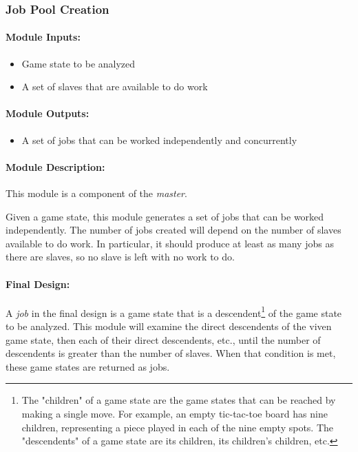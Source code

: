 \documentclass[pdftex,12pt,a4paper]{article}
\begin{document}
\subsubsection{Job Pool Creation}

\paragraph{Module Inputs:}
\begin{itemize}
\item Game state to be analyzed
\item A set of slaves that are available to do work
\end{itemize}

\paragraph{Module Outputs:}
\begin{itemize}
\item A set of jobs that can be worked independently and concurrently
\end{itemize}

\paragraph{Module Description:\\}
This module is a component of the \emph{master}.

Given a game state, this module generates a set of jobs that can be worked independently. The number of jobs created will depend on the number of slaves available to do work. In particular, it should produce at least as many jobs as there are slaves, so no slave is left with no work to do.

\paragraph{Final Design:\\}
A \emph{job} in the final design is a game state that is a descendent\footnote{The "children" of a game state are the game states that can be reached by making a single move. For example, an empty tic-tac-toe board has nine children, representing a piece played in each of the nine empty spots. The "descendents" of a game state are its children, its children's children, etc.} of the game state to be analyzed. This module will examine the direct descendents of the viven game state, then each of their direct descendents, etc., until the number of descendents is greater than the number of slaves. When that condition is met, these game states are returned as jobs.
\end{document}
